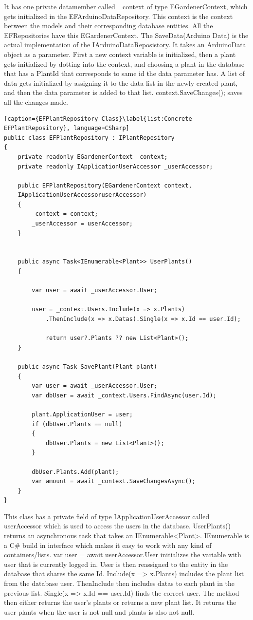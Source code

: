 \documentclass[a4paper,12pt,twoside,openright,titlepage]{book}
\begin{document}
It has one private datamember called \_context of type EGardenerContext, which gets initialized in the EFArduinoDataRepository. This context is the context between the models and their corresponding database entities. All the EFRepositories have this EGardenerContext. The SaveData(Arduino Data) is the actual implementation of the IArduinoDataReposistory. It takes an ArduinoData object as a parameter. First a new context variable is initialized, then a plant gets initialized by dotting into the context, and choosing a plant in the database that has a PlantId that corresponds to same id the data parameter has. A list of data gets initialized by assigning it to the data list in the newly created plant, and then the data parameter is added to that list. context.SaveChanges(); saves all the changes made.  


\begin{lstlisting}[caption={EFPlantRepository Class}\label{list:Concrete EFPlantRepository}, language=CSharp]
public class EFPlantRepository : IPlantRepository
{
	private readonly EGardenerContext _context;
    private readonly IApplicationUserAccessor _userAccessor;

	public EFPlantRepository(EGardenerContext context,
	IApplicationUserAccessoruserAccessor)
	{
		_context = context;
        _userAccessor = userAccessor;
	}

        
	public async Task<IEnumerable<Plant>> UserPlants()
	{

		var user = await _userAccessor.User;
            
		user = _context.Users.Include(x => x.Plants)
			.ThenInclude(x => x.Datas).Single(x => x.Id == user.Id);
            
            return user?.Plants ?? new List<Plant>();
	}

	public async Task SavePlant(Plant plant)
	{
		var user = await _userAccessor.User;
		var dbUser = await _context.Users.FindAsync(user.Id);

		plant.ApplicationUser = user;
		if (dbUser.Plants == null)
		{
	        dbUser.Plants = new List<Plant>();
        }
            
        dbUser.Plants.Add(plant);
        var amount = await _context.SaveChangesAsync();
	}
}
\end{lstlisting}
This class has a private field of type IApplicationUserAccessor called userAccessor which is used to access the users in the database. UserPlants() returns an asynchronous task that takes an IEnumerable<Plant>. IEnumerable is a C\#  build in interface which makes it easy to work with any kind of containers/lists. var user = await userAccessor.User initializes the variable with user that is currently logged in. User is then reassigned to the entity in the database that shares the same Id. Include(x => x.Plants) includes the plant list from the database user. ThenInclude then includes datas to each plant in the previous list. Single(x => x.Id == user.Id) finds the correct user. The method then either returns the user's plants or returns a new plant list. It returns the user plants when the user is not null and plants is also not null.
\end{document}
